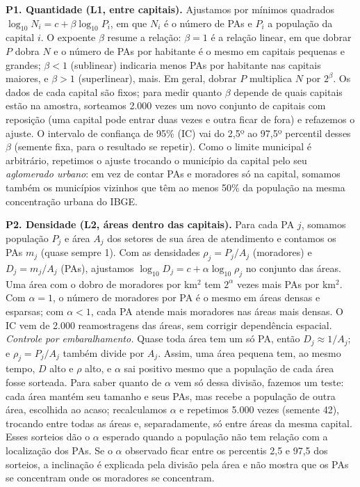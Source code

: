 \documentclass[10pt,a4paper,twocolumn]{article}
\begin{document}
\textbf{P1. Quantidade (L1, entre capitais).} Ajustamos por mínimos quadrados $\log_{10}N_i=c+\beta\log_{10}P_i$, em que $N_i$ é o número de PAs e $P_i$ a população da capital $i$. O expoente $\beta$ resume a relação: $\beta=1$ é a relação linear, em que dobrar $P$ dobra $N$ e o número de PAs por habitante é o mesmo em capitais pequenas e grandes; $\beta<1$ (sublinear) indicaria menos PAs por habitante nas capitais maiores, e $\beta>1$ (superlinear), mais. Em geral, dobrar $P$ multiplica $N$ por $2^{\beta}$. Os dados de cada capital são fixos; para medir quanto $\beta$ depende de quais capitais estão na amostra, sorteamos 2.000 vezes um novo conjunto de capitais com reposição (uma capital pode entrar duas vezes e outra ficar de fora) e refazemos o ajuste. O intervalo de confiança de 95\% (IC) vai do 2,5º ao 97,5º percentil desses $\beta$ (semente fixa, para o resultado se repetir). Como o limite municipal é arbitrário, repetimos o ajuste trocando o município da capital pelo seu \emph{aglomerado urbano}: em vez de contar PAs e moradores só na capital, somamos também os municípios vizinhos que têm ao menos 50\% da população na mesma concentração urbana do IBGE.

\textbf{P2. Densidade (L2, áreas dentro das capitais).} Para cada PA $j$, somamos população $P_j$ e área $A_j$ dos setores de sua área de atendimento e contamos os PAs $m_j$ (quase sempre 1). Com as densidades $\rho_j=P_j/A_j$ (moradores) e $D_j=m_j/A_j$ (PAs), ajustamos $\log_{10}D_j=c+\alpha\log_{10}\rho_j$ no conjunto das áreas. Uma área com o dobro de moradores por km$^2$ tem $2^{\alpha}$ vezes mais PAs por km$^2$. Com $\alpha=1$, o número de moradores por PA é o mesmo em áreas densas e esparsas; com $\alpha<1$, cada PA atende mais moradores nas áreas mais densas. O IC vem de 2.000 reamostragens das áreas, sem corrigir dependência espacial. \emph{Controle por embaralhamento.} Quase toda área tem um só PA, então $D_j\approx1/A_j$; e $\rho_j=P_j/A_j$ também divide por $A_j$. Assim, uma área pequena tem, ao mesmo tempo, $D$ alto e $\rho$ alto, e $\alpha$ sai positivo mesmo que a população de cada área fosse sorteada. Para saber quanto de $\alpha$ vem só dessa divisão, fazemos um teste: cada área mantém seu tamanho e seus PAs, mas recebe a população de outra área, escolhida ao acaso; recalculamos $\alpha$ e repetimos 5.000 vezes (semente 42), trocando entre todas as áreas e, separadamente, só entre áreas da mesma capital. Esses sorteios dão o $\alpha$ esperado quando a população não tem relação com a localização dos PAs. Se o $\alpha$ observado ficar entre os percentis 2,5 e 97,5 dos sorteios, a inclinação é explicada pela divisão pela área e não mostra que os PAs se concentram onde os moradores se concentram.
\end{document}

